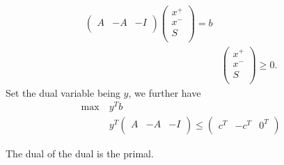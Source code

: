 \begin{eg}
\begin{align*}
\begin{pmatrix}
			A & -A & -I \\
		\end{pmatrix}\begin{pmatrix}
			x^+ \\
			x^- \\
			S   \\
		\end{pmatrix} = b \\
		      & \begin{pmatrix}
			x^+ \\
			x^- \\
			S   \\
		\end{pmatrix}\geq 0.
	\end{align*}
	Set the dual variable being \(y\), we further have
	\begin{align*}
		\max~ & y^{T}b                                                           \\
		      & y^{T} \begin{pmatrix}
			A & -A & -I \\
		\end{pmatrix} \leq \begin{pmatrix}
			c^{T} & -c^{T} & 0^{T} \\
		\end{pmatrix}
	\end{align*}


\end{eg}

\begin{note}
	The dual of the dual is the primal.
\end{note}
